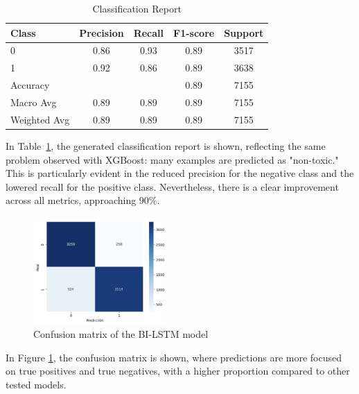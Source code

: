\begin{table}[H]
\centering
\caption{Classification Report}
\label{tab:classification_report}
\begin{tabular}{lcccc}
\toprule
Class        & Precision & Recall & F1-score & Support \\
\midrule
0            & 0.86      & 0.93   & 0.89     & 3517    \\
1            & 0.92      & 0.86   & 0.89     & 3638    \\
\midrule
Accuracy     &           &        & 0.89     & 7155    \\
Macro Avg    & 0.89      & 0.89   & 0.89     & 7155    \\
Weighted Avg & 0.89      & 0.89   & 0.89     & 7155    \\
\bottomrule
\end{tabular}
\end{table}

In Table~\ref{tab:classification_report}, the generated classification report is shown, reflecting the same problem observed with XGBoost: many examples are predicted as "non-toxic." This is particularly evident in the reduced precision for the negative class and the lowered recall for the positive class. Nevertheless, there is a clear improvement across all metrics, approaching 90\%.

\begin{figure}[H]
    \centering
    \includegraphics[width=0.45\textwidth]{images/confusion_matrix_bilstm.png}
    \caption{Confusion matrix of the BI-LSTM model}
    \label{fig:confusion_matrix_bilstm}
\end{figure}

In Figure \ref{fig:confusion_matrix_bilstm}, the confusion matrix is shown, where predictions are more focused on true positives and true negatives, with a higher proportion compared to other tested models.